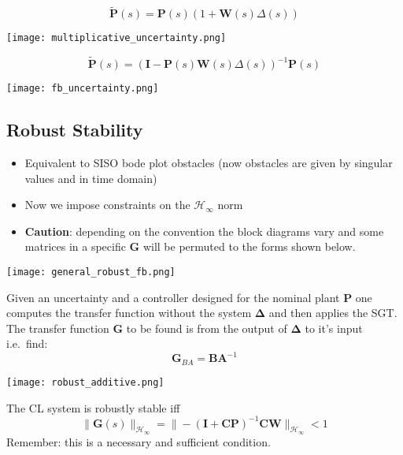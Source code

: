 \begin{equation*}
    \tilde{\mathbf{P}}(s)=\mathbf{P}(s)(1+\mathbf{W}(s)\Delta(s))
\end{equation*}
\begin{center}
    \texttt{[image: multiplicative\_uncertainty.png]}
\end{center}
\begin{equation*}
    \tilde{\mathbf{P}}(s)={(\mathbf{I}-\mathbf{P}(s)\mathbf{W}(s)\Delta(s))}^{-1}\mathbf{P}(s)
\end{equation*}
\begin{center}
    \texttt{[image: fb\_uncertainty.png]}
\end{center}

\subsection{Robust Stability}
\begin{itemize}
    \item Equivalent to SISO bode plot obstacles (now obstacles are given by singular values and in time domain)
    \item Now we impose constraints on the $\mathcal{H}_{\infty}$ norm
    \item \textbf{Caution}: depending on the convention the block diagrams vary and some matrices in a specific $\mathbf{G}$ will be permuted to the forms shown below.
\end{itemize}


\begin{center}
    \texttt{[image: general\_robust\_fb.png]}
\end{center}
Given an uncertainty and a controller designed for the nominal plant $\mathbf{P}$ one computes the transfer function without the system $\boldsymbol{\Delta}$ and then applies the SGT. The transfer function $\mathbf{G}$ to be found is from the output of $\boldsymbol{\Delta}$ to it's input i.e.\ find:
\begin{equation*}
    \mathbf{G}_{BA}=\mathbf{BA}^{-1}
\end{equation*}

\begin{center}
    \texttt{[image: robust\_additive.png]}
\end{center}
The CL system is robustly stable iff
\begin{equation*}
    \|\mathbf{G}(s)\|_{\mathcal{H}_\infty}=\|-{(\mathbf{I}+\mathbf{C}\mathbf{P})}^{-1}\mathbf{C}\mathbf{W}\|_{\mathcal{H}_\infty}<1
\end{equation*}
Remember: this is a necessary and sufficient condition.

